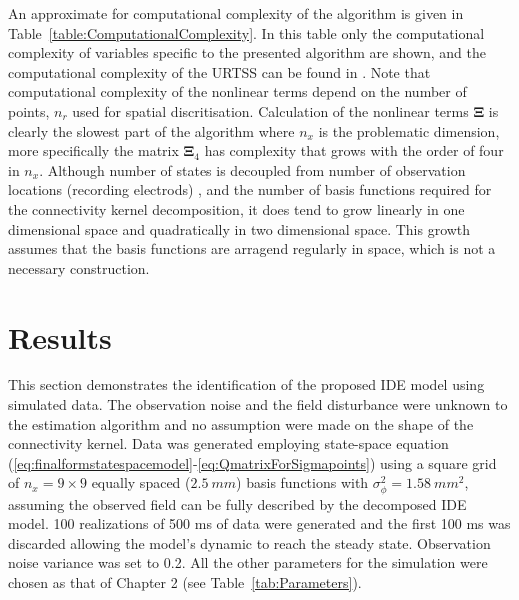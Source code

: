 \documentclass[]{article}
\begin{document}
An approximate for computational complexity of the algorithm is given in Table~\ref{table:ComputationalComplexity}.  In this table only the computational complexity of variables specific to the presented algorithm are shown, and the computational complexity of the URTSS can be found in \cite{Sarkka2010}. Note that computational complexity of the nonlinear terms depend on the number of points, $n_r$ used for spatial discritisation. Calculation of the nonlinear terms $\boldsymbol\Xi$ is clearly the slowest part of the algorithm where $n_x$ is the problematic dimension, more specifically the matrix $\boldsymbol\Xi_4 $ has complexity that grows with the order of four in $n_x$. Although number of states  is decoupled from number of observation locations (recording electrods) , and the number of basis functions required for the connectivity kernel decomposition, it does tend to grow linearly in one dimensional space and quadratically in two dimensional space. This growth assumes that the basis functions are arragend regularly in space, which is not a necessary construction.
 
\section{Results}\label{sec:EM-Results}
This section demonstrates the identification of the proposed IDE model using simulated data. The observation noise and the field disturbance were unknown to the estimation algorithm and no assumption were made on the shape of the connectivity kernel. Data was generated employing state-space equation (\ref{eq:finalformstatespacemodel}-\ref{eq:QmatrixForSigmapoints}) using a square grid of $n_x= 9 \times 9$ equally spaced ($2.5~mm$) basis functions with $\sigma_{\phi}^2=1.58~mm^2$, assuming the observed field can be fully described by the decomposed IDE model. 100 realizations of 500 ms of data were generated and the first 100 ms was discarded allowing the model's dynamic to reach the steady state. Observation noise variance was set to 0.2. All the other parameters for the simulation were chosen as that of Chapter 2 (see Table~\ref{tab:Parameters}).
\end{document}
